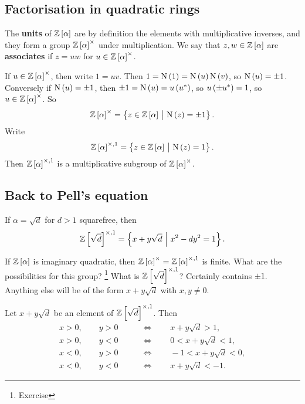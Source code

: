 \subsection{Factorisation in quadratic rings}

\begin{definition}
The \textbf{units} of $ \ZZ\sbr{\alpha} $ are by definition the elements with multiplicative inverses, and they form a group $ \ZZ\sbr{\alpha}^\times $ under multiplication. We say that $ z, w \in \ZZ\sbr{\alpha} $ are \textbf{associates} if $ z = uw $ for $ u \in \ZZ\sbr{\alpha}^\times $.
\end{definition}

If $ u \in \ZZ\sbr{\alpha}^\times $, then write $ 1 = uv $. Then $ 1 = \N\br{1} = \N\br{u}\N\br{v} $, so $ \N\br{u} = \pm 1 $. Conversely if $ \N\br{u} = \pm 1 $, then $ \pm 1 = \N\br{u} = u\br{u^*} $, so $ u\br{\pm u^*} = 1 $, so $ u \in \ZZ\sbr{\alpha}^\times $. So
$$ \ZZ\sbr{\alpha}^\times = \cbr{z \in \ZZ\sbr{\alpha} \st \N\br{z} = \pm 1}. $$
Write
$$ \ZZ\sbr{\alpha}^{\times, 1} = \cbr{z \in \ZZ\sbr{\alpha} \st \N\br{z} = 1}. $$
Then $ \ZZ\sbr{\alpha}^{\times, 1} $ is a multiplicative subgroup of $ \ZZ\sbr{\alpha}^\times $.

\subsection{Back to Pell's equation}

\begin{example*}
If $ \alpha = \sqrt{d} $ for $ d > 1 $ squarefree, then
$$ \ZZ\sbr{\sqrt{d}}^{\times, 1} = \cbr{x + y\sqrt{d} \st x^2 - dy^2 = 1}. $$
\end{example*}

If $ \ZZ\sbr{\alpha} $ is imaginary quadratic, then $ \ZZ\sbr{\alpha}^\times = \ZZ\sbr{\alpha}^{\times, 1} $ is finite. What are the possibilities for this group? \footnote{Exercise} What is $ \ZZ\sbr{\sqrt{d}}^{\times, 1} $? Certainly contains $ \pm 1 $. Anything else will be of the form $ x + y\sqrt{d} $ with $ x, y \ne 0 $.

\begin{lemma}
\label{lem:62}
Let $ x + y\sqrt{d} $ be an element of $ \ZZ\sbr{\sqrt{d}}^{\times, 1} $. Then
\begin{align*}
x > 0, \qquad y > 0 \qquad & \iff \qquad x + y\sqrt{d} > 1, \\
x > 0, \qquad y < 0 \qquad & \iff \qquad 0 < x + y\sqrt{d} < 1, \\
x < 0, \qquad y > 0 \qquad & \iff \qquad -1 < x + y\sqrt{d} < 0, \\
x < 0, \qquad y < 0 \qquad & \iff \qquad x + y\sqrt{d} < -1.
\end{align*}
\end{lemma}

